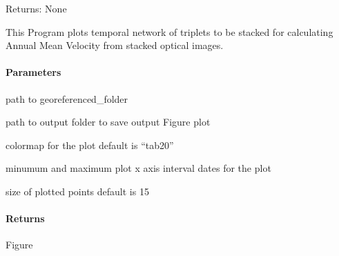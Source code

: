 \documentclass[letterpaper,10pt,english]{sphinxmanual}
\begin{document}
\begin{fulllineitems}
\sphinxAtStartPar
Returns:
None

\end{fulllineitems}


\begin{fulllineitems}
\label{\detokenize{akhdefo_functions:akhdefo_functions.AkhdefoPlot.plot_stackNetwork}}
\pysigstartsignatures
{}
\pysigstopsignatures
\sphinxAtStartPar
This Program plots temporal network of triplets to be stacked for calculating 
Annual Mean Velocity from stacked optical images.


\paragraph{Parameters}
\label{\detokenize{akhdefo_functions:id3}}\begin{description}
\sphinxAtStartPar
path to georeferenced\_folder

\sphinxAtStartPar
path to output folder to save output Figure plot

\sphinxAtStartPar
colormap for the plot default is “tab20”

\sphinxAtStartPar
minumum and maximum plot x axis interval dates for the plot

\sphinxAtStartPar
size of plotted points default is 15

\end{description}


\paragraph{Returns}
\label{\detokenize{akhdefo_functions:id4}}
\sphinxAtStartPar
Figure

\end{fulllineitems}
\end{document}
